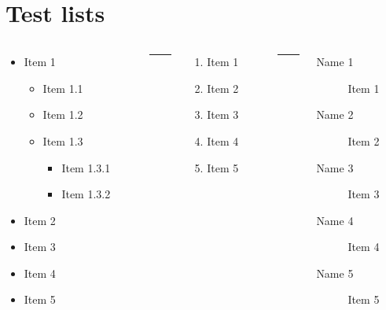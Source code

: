 \documentclass[%
    listings={
        Lean=listings-lean,
        Go
    },
]{custom}
\begin{document}
\section{Test lists}
\begin{sframe}
	\begin{columns}
		\begin{column}{.32\linewidth}
			\begin{itemize}
				\item Item 1
				      \begin{itemize}
					      \item Item 1.1
					      \item Item 1.2
					      \item Item 1.3
					            \begin{itemize}
						            \item Item 1.3.1
						            \item Item 1.3.2
					            \end{itemize}
				      \end{itemize}
				\item Item 2
				\item Item 3
				\item Item 4
				\item Item 5
			\end{itemize}
		\end{column}
		\begin{column}{.05\linewidth}
			\centering
			\rule{.1mm}{.7\textheight}
		\end{column}
		\begin{column}{.24\linewidth}
			\begin{enumerate}
				\item Item 1
				\item Item 2
				\item Item 3
				\item Item 4
				\item Item 5
			\end{enumerate}
		\end{column}
		\begin{column}{.05\linewidth}
			\centering
			\rule{.1mm}{.7\textheight}
		\end{column}
		\begin{column}{.3\linewidth}
			\begin{description}
				\item[Name 1] Item 1
				\item[Name 2] Item 2
				\item[Name 3] Item 3
				\item[Name 4] Item 4
				\item[Name 5] Item 5
			\end{description}
		\end{column}
	\end{columns}
\end{sframe}
\end{document}
